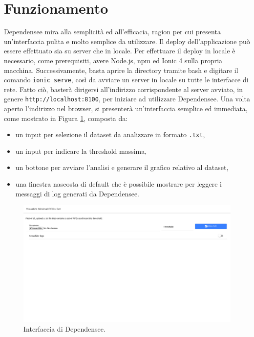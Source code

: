 \section{Funzionamento}
Dependensee mira alla semplicit\`{a} ed all'efficacia, ragion per cui presenta un'interfaccia pulita e molto semplice da utilizzare. Il deploy dell'applicazione pu\`{o} essere effettuato sia su server che in locale. Per effettuare il deploy in locale \`{e} necessario, come prerequisiti, avere Node.js, npm ed Ionic 4 sulla propria macchina. Successivamente, basta aprire la directory tramite bash e digitare il comando \texttt{ionic serve}, cos\`{i} da avviare un server in locale su tutte le interfacce di rete. Fatto ci\`{o}, baster\`{a} dirigersi all'indirizzo corrispondente al server avviato, in genere \texttt{http://localhost:8100}, per iniziare ad utilizzare Dependensee. Una volta aperto l'indirizzo nel browser, si presenter\`{a} un'interfaccia semplice ed immediata, come mostrato in Figura \ref{fig:dependensee_main_screen}, composta da:
\begin{itemize}
    \item un input per selezione il dataset da analizzare in formato \texttt{.txt},
    \item un input per indicare la threshold massima,
    \item un bottone per avviare l'analisi e generare il grafico relativo al dataset,
    \item una finestra nascosta di default che \`{e} possibile mostrare per leggere i messaggi di log generati da Dependensee.
\end{itemize}
\begin{figure}[ht]
    \centering
    \includegraphics[width=\linewidth]{capitoli/figure/dependensee_main_screen}
    \caption{Interfaccia di Dependensee.}
    \label{fig:dependensee_main_screen}
\end{figure}
